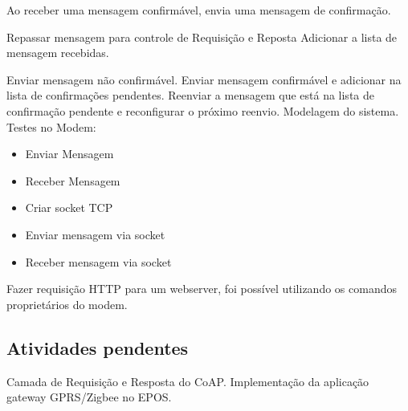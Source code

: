 Ao receber uma mensagem confirm\'avel, envia uma mensagem de confirma\c{c}\~ao.

Repassar mensagem para controle de Requisi\c{c}\~ao e Reposta Adicionar a lista de mensagem recebidas.

Enviar mensagem n\~ao confirm\'avel.
Enviar mensagem confirm\'avel e adicionar na lista de confirma\c{c}\~oes pendentes.
Reenviar a mensagem que est\'a na lista de confirma\c{c}\~ao pendente e reconfigurar o pr\'oximo reenvio.
Modelagem do sistema.
Testes no Modem:
\begin{itemize}
    \item Enviar Mensagem
    \item Receber Mensagem
    \item Criar socket TCP
    \item Enviar mensagem via socket
    \item Receber mensagem via socket
\end{itemize}

Fazer requisi\c{c}\~ao HTTP para um webserver, foi poss\'ivel utilizando os comandos propriet\'arios do modem.

\subsection{Atividades pendentes}
Camada de Requisi\c{c}\~ao e Resposta do CoAP.
Implementa\c{c}\~ao da aplica\c{c}\~ao gateway GPRS/Zigbee no EPOS.
